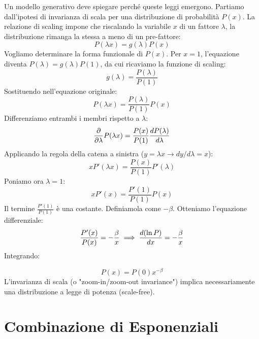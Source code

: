 Un modello generativo deve spiegare perché queste leggi emergono. Partiamo dall'ipotesi di invarianza di scala per una distribuzione di probabilità $P(x)$.
La relazione di scaling impone che riscalando la variabile $x$ di un fattore $\lambda$, la distribuzione rimanga la stessa a meno di un pre-fattore:
\begin{equation}
    P(\lambda x) = g(\lambda) P(x)
\end{equation}
Vogliamo determinare la forma funzionale di $P(x)$.
Per $x=1$, l'equazione diventa $P(\lambda) = g(\lambda)P(1)$, da cui ricaviamo la funzione di scaling:
\begin{equation}
    g(\lambda) = \frac{P(\lambda)}{P(1)}
\end{equation}
Sostituendo nell'equazione originale:
\begin{equation}
    P(\lambda x) = \frac{P(\lambda)}{P(1)} P(x)
\end{equation}
Differenziamo entrambi i membri rispetto a $\lambda$:
\begin{equation}
    \frac{\partial }{\partial \lambda} P(\lambda x) = \frac{P(x)}{P(1)} \frac{d P(\lambda)}{d \lambda}
\end{equation}
Applicando la regola della catena a sinistra ($y=\lambda x \to dy/d\lambda = x$):
\begin{equation}
    x P'(\lambda x) = \frac{P(x)}{P(1)} P'(\lambda)
\end{equation}
Poniamo ora $\lambda = 1$:
\begin{equation}
    x P'(x) = \frac{P'(1)}{P(1)} P(x)
\end{equation}
Il termine $\frac{P'(1)}{P(1)}$ è una costante. Definiamola come $-\beta$.
Otteniamo l'equazione differenziale:
\begin{equation}
    \frac{P'(x)}{P(x)} = -\frac{\beta}{x} \implies \frac{d (\ln P)}{d x} = -\frac{\beta}{x}
\end{equation}
Integrando:
\begin{tcolorbox}[colback=yellow!25, colframe=yellow!75!orange, coltitle=black, title=\textbf{Legge di Potenza}]
\begin{equation}
    P(x) = P(0) x^{-\beta}
\end{equation}
L'invarianza di scala (o "zoom-in/zoom-out invariance") implica necessariamente una distribuzione a legge di potenza (scale-free).
\end{tcolorbox}

\section{Combinazione di Esponenziali}

